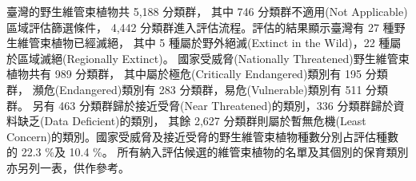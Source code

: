 
\indent 臺灣的野生維管束植物共 5,188 分類群，
其中 746 分類群不適用(Not Applicable)區域評估篩選條件，
4,442 分類群進入評估流程。評估的結果顯示臺灣有 27 種野生維管束植物已經滅絕，
其中 5 種屬於野外絕滅(Extinct in the Wild)，22 種屬於區域滅絕(Regionally Extinct)。
國家受威脅(Nationally Threatened)野生維管束植物共有 989 分類群，
其中屬於極危(Critically Endangered)類別有 195 分類群，
瀕危(Endangered)類別有 283 分類群，易危(Vulnerable)類別有 511 分類群。
另有 463 分類群歸於接近受脅(Near Threatened)的類別，336 分類群歸於資料缺乏(Data Deficient)的類別，
其餘 2,627 分類群則屬於暫無危機(Least Concern)的類別。國家受威脅及接近受脅的野生維管束植物種數分別占評估種數的 22.3 \%及 10.4 \%。
所有納入評估候選的維管束植物的名單及其個別的保育類別亦另列一表，供作參考。\\
